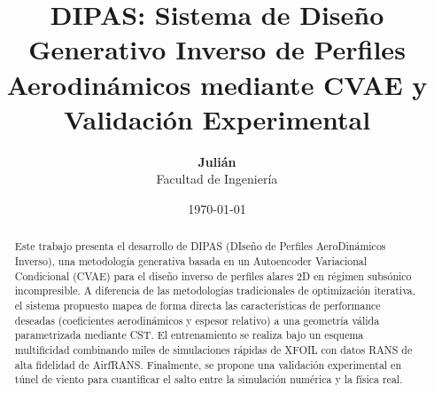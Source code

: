 \documentclass[12pt,a4paper]{article}
\title{\textbf{DIPAS: Sistema de Diseño Generativo Inverso de Perfiles Aerodinámicos mediante CVAE y Validación Experimental}}
\author{\textbf{Julián} \\ \small Facultad de Ingeniería}
\date{\today}
\begin{document}
\maketitle

\begin{abstract}
Este trabajo presenta el desarrollo de DIPAS (DIseño de Perfiles AeroDinámicos Inverso), una metodología generativa basada en un Autoencoder Variacional Condicional (CVAE) para el diseño inverso de perfiles alares 2D en régimen subsónico incompresible. A diferencia de las metodologías tradicionales de optimización iterativa, el sistema propuesto mapea de forma directa las características de performance deseadas (coeficientes aerodinámicos y espesor relativo) a una geometría válida parametrizada mediante CST. El entrenamiento se realiza bajo un esquema multificidad combinando miles de simulaciones rápidas de XFOIL con datos RANS de alta fidelidad de AirfRANS. Finalmente, se propone una validación experimental en túnel de viento para cuantificar el salto entre la simulación numérica y la física real.
\end{abstract}

\newpage
\tableofcontents
\newpage






\newpage


\end{document}
